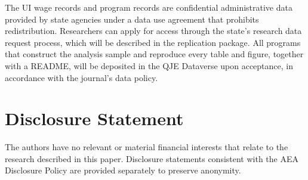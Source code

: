 \documentclass[12pt]{article}
\begin{document}
The UI wage records and program records are confidential administrative data provided by state agencies under a data use agreement that prohibits redistribution. Researchers can apply for access through the state's research data request process, which will be described in the replication package. All programs that construct the analysis sample and reproduce every table and figure, together with a README, will be deposited in the QJE Dataverse upon acceptance, in accordance with the journal's data policy.

\section*{Disclosure Statement}

The authors have no relevant or material financial interests that relate to the research described in this paper. Disclosure statements consistent with the AEA Disclosure Policy are provided separately to preserve anonymity.
\end{document}

